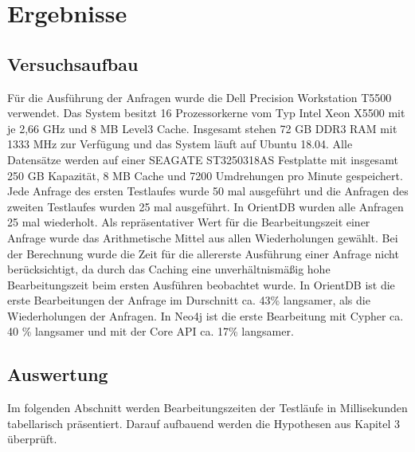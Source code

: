 
\chapter{Ergebnisse} %

\label{Kaptiel4} %

\section{Versuchsaufbau}
Für die Ausführung der Anfragen wurde die Dell Precision Workstation T5500 verwendet. Das System besitzt 16 Prozessorkerne vom Typ Intel Xeon  X5500 mit je 2,66 GHz und  8 MB Level3 Cache. Insgesamt stehen 72 GB DDR3 RAM mit 1333 MHz zur Verfügung und das System läuft auf Ubuntu 18.04. Alle Datensätze werden auf einer SEAGATE ST3250318AS Festplatte mit insgesamt 250 GB Kapazität, 8 MB Cache und 7200 Umdrehungen pro Minute gespeichert.\newline
 Jede Anfrage des ersten Testlaufes wurde 50 mal ausgeführt und die Anfragen des zweiten Testlaufes wurden 25 mal ausgeführt. In OrientDB wurden alle Anfragen 25 mal wiederholt. Als repräsentativer Wert für die Bearbeitungszeit einer Anfrage  wurde das Arithmetische Mittel aus allen Wiederholungen gewählt. Bei der Berechnung wurde die Zeit für die allererste Ausführung einer Anfrage nicht berücksichtigt, da durch das Caching eine unverhältnismäßig hohe Bearbeitungszeit beim ersten Ausführen beobachtet wurde. In OrientDB ist die erste Bearbeitungen der Anfrage im Durschnitt ca. 43\% langsamer, als die Wiederholungen  der Anfragen. In Neo4j ist die erste Bearbeitung mit Cypher ca. 40 \% langsamer und mit der Core API ca. 17\% langsamer.  
\section{Auswertung}
Im folgenden Abschnitt werden Bearbeitungszeiten der Testläufe in Millisekunden tabellarisch präsentiert.  Darauf aufbauend werden die Hypothesen aus Kapitel 3 überprüft.  

